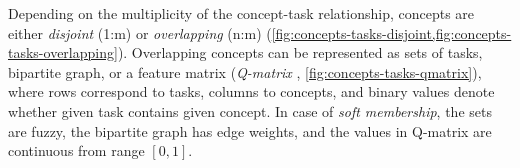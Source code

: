 
Depending on the multiplicity of the concept-task relationship,
concepts are either \emph{disjoint} (1:m) or \emph{overlapping} (n:m)
(\cref{fig:concepts-tasks-disjoint,fig:concepts-tasks-overlapping}).
Overlapping concepts can be represented as sets of tasks, bipartite graph,
or a feature matrix
(\emph{Q-matrix} \cite{qmatrix}, \cref{fig:concepts-tasks-qmatrix}),
where rows correspond to tasks, columns to concepts,
and binary values denote whether given task contains given concept. %
In case of \emph{soft membership}, the sets are fuzzy, the bipartite graph has
edge weights, and the values in Q-matrix are continuous from range $[0, 1]$.

